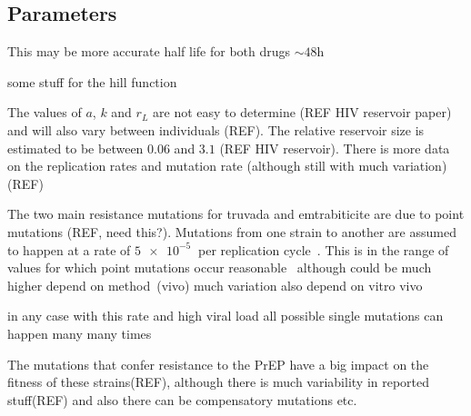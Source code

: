 \documentclass[DIV=15]{scrartcl}
\begin{document}
 
 
  



\subsection{Parameters}
\label{Parameters}


 This may be more accurate half life for both drugs $\sim 48$h~\cite{patterson2011}
 
 

some stuff for the hill function~\cite{shirreff2011}
~\cite{hollingsworth2008}



The values of $a$, $k$ and $r_L$ are not easy to determine (REF HIV reservoir paper)
and will also vary between individuals (REF). The relative reservoir size is estimated to be between $0.06$ and $3.1$ (REF HIV reservoir). There is more data on the replication rates and mutation rate (although still with much variation) (REF)

The two main resistance mutations for truvada and emtrabiticite are due to point mutations (REF, need this?). Mutations from one strain to another are assumed to happen at a rate of $\SI{5e-5}{}$ per replication cycle~\cite{gao2004}. This is in the range of values for which point mutations occur reasonable~\cite{abram2010}
although could be much higher depend on method~\cite{cuevas2015}(vivo) much variation also depend on vitro vivo

in any case with this rate  and high viral load all possible single mutations can happen many many times~\cite{coffin1995}

The mutations that confer resistance to the PrEP have a big impact on the fitness of these strains(REF), although there is much variability in reported stuff(REF) and also there can be compensatory mutations etc.


\end{document}

